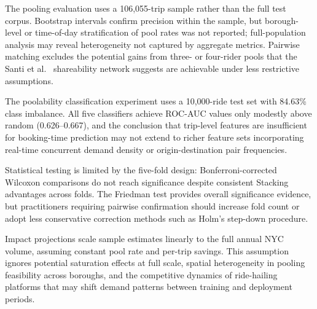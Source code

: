 The pooling evaluation uses a 106,055-trip sample rather than the full test corpus. Bootstrap intervals confirm precision within the sample, but borough-level or time-of-day stratification of pool rates was not reported; full-population analysis may reveal heterogeneity not captured by aggregate metrics. Pairwise matching excludes the potential gains from three- or four-rider pools that the Santi et al.~\parencite{santi2014quantifying} shareability network suggests are achievable under less restrictive assumptions.

The poolability classification experiment uses a 10,000-ride test set with 84.63\% class imbalance. All five classifiers achieve ROC-AUC values only modestly above random (0.626--0.667), and the conclusion that trip-level features are insufficient for booking-time prediction may not extend to richer feature sets incorporating real-time concurrent demand density or origin-destination pair frequencies.

Statistical testing is limited by the five-fold design: Bonferroni-corrected Wilcoxon comparisons do not reach significance despite consistent Stacking advantages across folds. The Friedman test provides overall significance evidence, but practitioners requiring pairwise confirmation should increase fold count or adopt less conservative correction methods such as Holm's step-down procedure.

Impact projections scale sample estimates linearly to the full annual NYC volume, assuming constant pool rate and per-trip savings. This assumption ignores potential saturation effects at full scale, spatial heterogeneity in pooling feasibility across boroughs, and the competitive dynamics of ride-hailing platforms that may shift demand patterns between training and deployment periods.

\FloatBarrier
